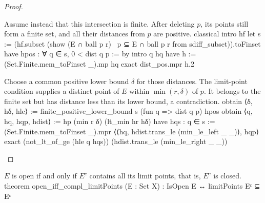 \begin{proof}
  \begin{lean}{Assume instead that this intersection is finite. After deleting $p$, its points still form a finite set, and all their distances from $p$ are positive.}
    classical
    intro hf
    let s := (hf.subset (show (E ∩ ball p r) \ {p} ⊆ E ∩ ball p r from sdiff_subset)).toFinset
    have hpos : ∀ q ∈ s, 0 < dist q p := by
      intro q hq
      have h := (Set.Finite.mem_toFinset _).mp hq
      exact dist_pos.mpr h.2
  \end{lean}

  \begin{lean}{Choose a common positive lower bound $\delta$ for those distances. The limit-point condition supplies a distinct point of $E$ within $\min(r,\delta)$ of $p$. It belongs to the finite set but has distance less than its lower bound, a contradiction.}
    obtain ⟨δ, hδ, hle⟩ := finite_positive_lower_bound s (fun q => dist q p) hpos
    obtain ⟨q, hq, hqp, hdist⟩ := hp (min r δ) (lt_min hr hδ)
    have hqs : q ∈ s := (Set.Finite.mem_toFinset _).mpr
      ⟨⟨hq, hdist.trans_le (min_le_left _ _)⟩, hqp⟩
    exact (not_lt_of_ge (hle q hqs)) (hdist.trans_le (min_le_right _ _))
  \end{lean}

\end{proof}

\begin{proposition} \label{an1:thm:complement-of-open-set-is-closed}
  \begin{lean}{$E$ is open if and only if $E^{c}$ contains all its limit points, that is, $E^{c}$ is closed.}
    theorem open_iff_compl_limitPoints (E : Set X) :
        IsOpen E ↔ limitPoints Eᶜ ⊆ Eᶜ
  \end{lean}
\end{proposition}


